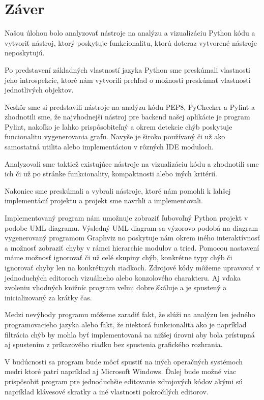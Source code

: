 \documentclass[11pt,oneside,final]{fithesis2}
\begin{document}
\chapter{Záver}

	Našou úlohou bolo analyzovať nástroje na analýzu a vizualizáciu Python kódu a vytvoriť nástroj, ktorý poskytuje funkcionalitu, ktorú doteraz vytvorené nástroje neposkytujú.
	
	Po predstavení základných vlastností jazyka Python sme preskúmali vlastnosti jeho introspekcie, ktoré nám vytvorili prehľad o možnosti preskúmať vlastnosti jednotlivých objektov.
	
	Neskôr sme si predstavili nástroje na analýzu kódu PEP8, PyChecker a Pylint a zhodnotili sme, že najvhodnejší nástroj pre backend našej aplikácie je program Pylint, nakoľko je ľahko prispôsobiteľný a okrem detekcie chýb poskytuje funcionalitu vygenerovania grafu. Navyše je široko používaný či už ako samostatná utilita alebo implementáciou v rôzných IDE moduloch.
	
	Analyzovali sme taktiež existujúce nástroje na vizualizáciu kódu a zhodnotili sme ich či už po stránke funkcionality, kompaktnosti alebo iných kritérií.
	
	Nakoniec sme preskúmali a vybrali nástroje, ktoré nám pomohli k ľahšej implementácií projektu a projekt sme navrhli a implementovali.
	
	Implementovaný program nám umožnuje zobraziť ľubovoľný Python projekt v podobe UML diagramu.  Výsledný UML diagram sa výzorovo podobá na diagram vygenerovaný programom Graphviz no poskytuje nám okrem iného interaktívnosť a možnosť zobraziť chyby v rámci hierarchie modulov a tried. Pomocou nastavení máme možnosť ignorovať či už celé skupiny chýb, konkrétne typy chýb či ignorovať chyby len na konkrétnych riadkoch. Zdrojové kódy môžeme upravovať v jednoduchých editoroch vizuálneho alebo konzolového charakteru. Aj vďaka zvoleniu vhodných knižníc program veľmi dobre škáluje a je spustený a inicializovaný za krátky čas.
	
	Medzi nevýhody programu môžeme zaradiť fakt, že slúži na analýzu len jedného programovacieho jazyka alebo fakt, že niektorá funkcionalita ako je napríklad filtrácia chýb by mohla byť implementovaná na nižšej úrovni aby bola prístupná aj spustením z príkazového riadku bez spustenia grafického rozhrania.
	
	V budúcnosti sa program bude môcť spustiť na iných operačných systémoch medri ktoré patrí napríklad aj Microsoft Windows. Ďalej bude možné viac prispôsobiť program pre jednoduchšie editovanie zdrojových kódov akými sú napríklad klávesové skratky a iné vlastnosti pokročilých editorov.
	
\end{document}
